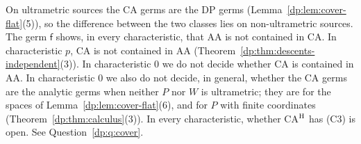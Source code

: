 On ultrametric sources the CA germs are the DP germs (Lemma~\ref{dp:lem:cover-flat}(5)), so the difference between the two classes lies on non-ultrametric sources. The germ $\mathsf f$ shows, in every characteristic, that AA is not contained in CA. In characteristic $p$, CA is not contained in AA (Theorem~\ref{dp:thm:descents-independent}(3)). In characteristic $0$ we do not decide whether CA is contained in AA. In characteristic $0$ we also do not decide, in general, whether the CA germs are the analytic germs when neither $P$ nor $W$ is ultrametric; they are for the spaces of Lemma~\ref{dp:lem:cover-flat}(6), and for $P$ with finite coordinates (Theorem~\ref{dp:thm:calculus}(3)). In every characteristic, whether CA$^{\rm H}$ has (C3) is open. See Question~\ref{dp:q:cover}.
